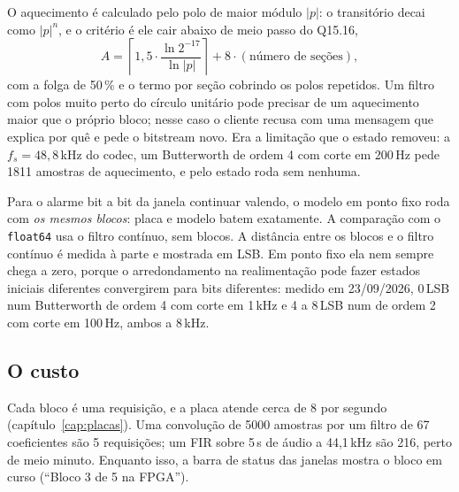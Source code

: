 O aquecimento é calculado pelo polo de maior módulo \(|p|\): o transitório
decai como \(|p|^n\), e o critério é ele cair abaixo de meio passo do Q15.16,
\[
  A = \left\lceil 1{,}5 \cdot \frac{\ln 2^{-17}}{\ln |p|} \right\rceil
      + 8 \cdot (\text{número de seções}),
\]
com a folga de 50\,\% e o termo por seção cobrindo os polos repetidos. Um filtro
com polos muito perto do círculo unitário pode precisar de um aquecimento maior
que o próprio bloco; nesse caso o cliente recusa com uma mensagem que explica
por quê e pede o bitstream novo. Era a limitação que o estado removeu: a
\(f_s = 48{,}8\)\,kHz do codec, um Butterworth de ordem 4 com corte em 200\,Hz
pede 1811 amostras de aquecimento, e pelo estado roda sem nenhuma.

Para o alarme bit a bit da janela continuar valendo, o modelo em ponto fixo
roda com \emph{os mesmos blocos}: placa e modelo batem exatamente. A
comparação com o \texttt{float64} usa o filtro contínuo, sem blocos. A distância
entre os blocos e o filtro contínuo é medida à parte e mostrada em LSB. Em ponto
fixo ela nem sempre chega a zero, porque o arredondamento na realimentação pode
fazer estados iniciais diferentes convergirem para bits diferentes: medido em
23/09/2026, 0\,LSB num Butterworth de ordem 4 com corte em 1\,kHz e 4 a 8\,LSB
num de ordem 2 com corte em 100\,Hz, ambos a 8\,kHz.

\subsection{O custo}

Cada bloco é uma requisição, e a placa atende cerca de 8 por segundo
(capítulo~\ref{cap:placas}). Uma convolução de 5000 amostras por um filtro de 67
coeficientes são 5 requisições; um FIR sobre 5\,s de áudio a 44,1\,kHz são 216,
perto de meio minuto. Enquanto isso, a barra de status das janelas mostra o
bloco em curso (``Bloco 3 de 5 na FPGA'').
